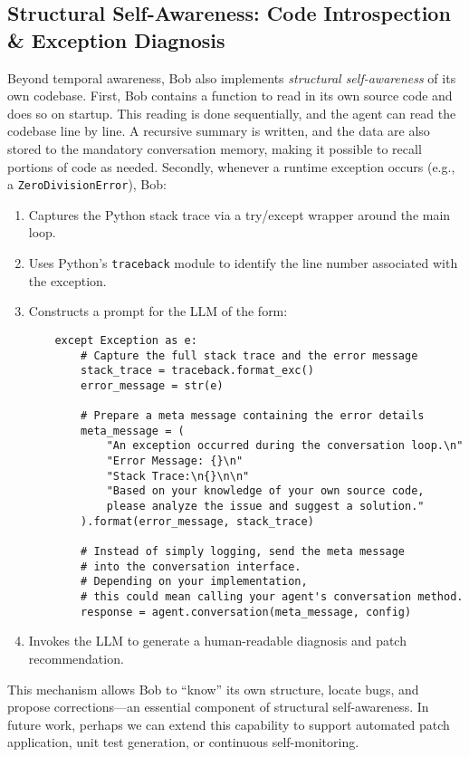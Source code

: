 \documentclass[conference]{IEEEtran}
\begin{document}
\subsection{Structural Self-Awareness: Code Introspection \& Exception Diagnosis}
Beyond temporal awareness, Bob also implements \emph{structural self-awareness} of its own codebase. 
First, Bob contains a function to read in its own source code and does so on startup.
This reading is done sequentially, and the agent can read the codebase line by line.  
A recursive summary is written, and the data are also stored to the mandatory conversation memory,
making it possible to recall portions of code as needed.  
Secondly, whenever a runtime exception occurs (e.g., a \texttt{ZeroDivisionError}), Bob:
\begin{enumerate}[leftmargin=*]
  \item Captures the Python stack trace via a try/except wrapper around the main loop.
  \item Uses Python’s \texttt{traceback} module to identify the line number associated with the exception.
  \item Constructs a prompt for the LLM of the form:
  \begin{verbatim} 
    except Exception as e:
        # Capture the full stack trace and the error message
        stack_trace = traceback.format_exc()
        error_message = str(e)
    
        # Prepare a meta message containing the error details
        meta_message = (
            "An exception occurred during the conversation loop.\n"
            "Error Message: {}\n"
            "Stack Trace:\n{}\n\n"
            "Based on your knowledge of your own source code, 
            please analyze the issue and suggest a solution."
        ).format(error_message, stack_trace)
    
        # Instead of simply logging, send the meta message 
        # into the conversation interface.
        # Depending on your implementation, 
        # this could mean calling your agent's conversation method.
        response = agent.conversation(meta_message, config)
\end{verbatim}
\item Invokes the LLM to generate a human-readable diagnosis and patch recommendation.
\end{enumerate}

This mechanism allows Bob to “know” its own structure, locate bugs, and propose corrections—an essential component of structural self-awareness. In future work, perhaps we can extend this capability to support automated patch application, unit test generation, or continuous self-monitoring.
\end{document}
